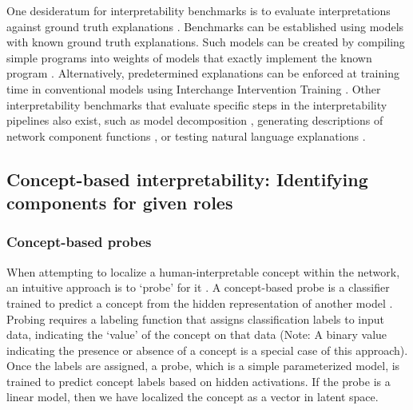 One desideratum for interpretability benchmarks is to evaluate interpretations against ground truth explanations \citep{Freiesleben_2023_weneedtotalk, Zhou_2022_featureattribution}. Benchmarks can be established using models with known ground truth explanations. Such models can be created by compiling simple programs into weights of models that exactly implement the known program \citep{lindner2023tracrcompiledtransformerslaboratory, Weiss_2021_transformer, thurnherr2024tracrbench,gupta2024interpbenchsemisynthetictransformersevaluating}.  Alternatively, predetermined explanations can be enforced at training time in conventional models using Interchange Intervention Training \citep{gupta2024interpbenchsemisynthetictransformersevaluating,Geiger_2022_CausalStructure}. Other interpretability benchmarks that evaluate specific steps in the interpretability pipelines also exist, such as model decomposition \citep{huang2024ravelevaluatinginterpretabilitymethods,makelov2024principledevaluationssparseautoencoders}, generating descriptions of network component functions \citep{schwettmann2023findfunctiondescriptionbenchmark} , or testing natural language explanations \citep{huang2023rigorouslyassessingnaturallanguage}.

\subsection{Concept-based interpretability: Identifying components for given roles}
\label{subsec:concept-based-interpretability}

\subsubsection{Concept-based probes}
\label{subsubsec:concept-based-probes}

When attempting to localize a human-interpretable concept within the network, an intuitive approach is to `probe' for it \citep{kohn-2015-whats, gupta-etal-2015-distributional, alain2018understandingintermediatelayersusing, ettinger-etal-2016-probing}. A concept-based probe is a classifier trained to predict a concept from the hidden representation of another model \citep{hupkes2018visualisationdiagnosticclassifiersreveal}. Probing requires a labeling function that assigns classification labels to input data, indicating the `value' of the concept on that data (Note: A binary value indicating the presence or absence of a concept is a special case of this approach). Once the labels are assigned, a probe, which is a simple parameterized model, is trained to predict concept labels based on hidden activations. If the probe is a linear model, then we have localized the concept as a vector in latent space.

